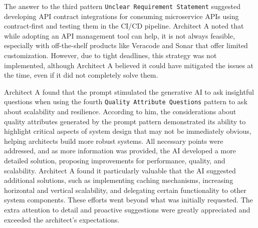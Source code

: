 \documentclass[runningheads]{llncs}
\begin{document}

The answer to the third pattern \texttt{Unclear Requirement Statement} suggested developing API contract integrations for consuming microservice APIs using contract-first and testing them in the CI/CD pipeline. Architect A noted that while adopting an API management tool can help, it is not always feasible, especially with off-the-shelf products like Veracode and Sonar that offer limited customization. However, due to tight deadlines, this strategy was not implemented, although Architect A believed it could have mitigated the issues at the time, even if it did not completely solve them.

Architect A found that the prompt stimulated the generative AI to ask insightful questions when using the fourth \texttt{Quality Attribute Questions} pattern to ask about scalability and resilience. According to him, the considerations about quality attributes generated by the prompt pattern demonstrated its ability to highlight critical aspects of system design that may not be immediately obvious, helping architects build more robust systems. All necessary points were addressed, and as more information was provided, the AI developed a more detailed solution, proposing improvements for performance, quality, and scalability. Architect A found it particularly valuable that the AI suggested additional solutions, such as implementing caching mechanisms, increasing horizontal and vertical scalability, and delegating certain functionality to other system components. These efforts went beyond what was initially requested. The extra attention to detail and proactive suggestions were greatly appreciated and exceeded the architect’s expectations.
\end{document}

